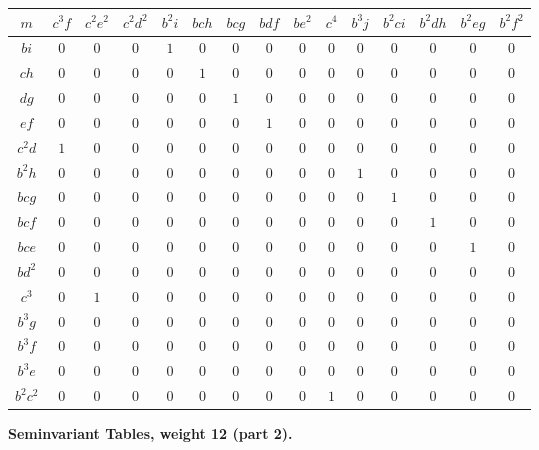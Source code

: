 \documentclass[11pt,a4paper]{book}
\begin{document}
\begin{longtable}{|c|c|c|c|c|c|c|c|c|c|c|c|c|c|c|}
\hline
$m$ & $c^3f$ & $c^2e^2$ & $c^2d^2$ & $b^2i$ & $bch$ & $bcg$ & $bdf$ & $be^2$ & $c^4$ & $b^3j$ & $b^2ci$ & $b^2dh$ & $b^2eg$ & $b^2f^2$\\
\hline
\endhead
$bi$ & $0$ & $0$ & $0$ & $1$ & $0$ & $0$ & $0$ & $0$ & $0$ & $0$ & $0$ & $0$ & $0$ & $0$\\
$ch$ & $0$ & $0$ & $0$ & $0$ & $1$ & $0$ & $0$ & $0$ & $0$ & $0$ & $0$ & $0$ & $0$ & $0$\\
$dg$ & $0$ & $0$ & $0$ & $0$ & $0$ & $1$ & $0$ & $0$ & $0$ & $0$ & $0$ & $0$ & $0$ & $0$\\
$ef$ & $0$ & $0$ & $0$ & $0$ & $0$ & $0$ & $1$ & $0$ & $0$ & $0$ & $0$ & $0$ & $0$ & $0$\\
$c^2d$ & $1$ & $0$ & $0$ & $0$ & $0$ & $0$ & $0$ & $0$ & $0$ & $0$ & $0$ & $0$ & $0$ & $0$\\
$b^2h$ & $0$ & $0$ & $0$ & $0$ & $0$ & $0$ & $0$ & $0$ & $0$ & $1$ & $0$ & $0$ & $0$ & $0$\\
$bcg$ & $0$ & $0$ & $0$ & $0$ & $0$ & $0$ & $0$ & $0$ & $0$ & $0$ & $1$ & $0$ & $0$ & $0$\\
$bcf$ & $0$ & $0$ & $0$ & $0$ & $0$ & $0$ & $0$ & $0$ & $0$ & $0$ & $0$ & $1$ & $0$ & $0$\\
$bce$ & $0$ & $0$ & $0$ & $0$ & $0$ & $0$ & $0$ & $0$ & $0$ & $0$ & $0$ & $0$ & $1$ & $0$\\
$bd^2$ & $0$ & $0$ & $0$ & $0$ & $0$ & $0$ & $0$ & $0$ & $0$ & $0$ & $0$ & $0$ & $0$ & $0$\\
$c^3$ & $0$ & $1$ & $0$ & $0$ & $0$ & $0$ & $0$ & $0$ & $0$ & $0$ & $0$ & $0$ & $0$ & $0$\\
$b^3g$ & $0$ & $0$ & $0$ & $0$ & $0$ & $0$ & $0$ & $0$ & $0$ & $0$ & $0$ & $0$ & $0$ & $0$\\
$b^3f$ & $0$ & $0$ & $0$ & $0$ & $0$ & $0$ & $0$ & $0$ & $0$ & $0$ & $0$ & $0$ & $0$ & $0$\\
$b^3e$ & $0$ & $0$ & $0$ & $0$ & $0$ & $0$ & $0$ & $0$ & $0$ & $0$ & $0$ & $0$ & $0$ & $0$\\
$b^2c^2$ & $0$ & $0$ & $0$ & $0$ & $0$ & $0$ & $0$ & $0$ & $1$ & $0$ & $0$ & $0$ & $0$ & $0$\\
\hline
\end{longtable}

\newpage
\textbf{Seminvariant Tables, weight 12 (part 2).}
\end{document}
